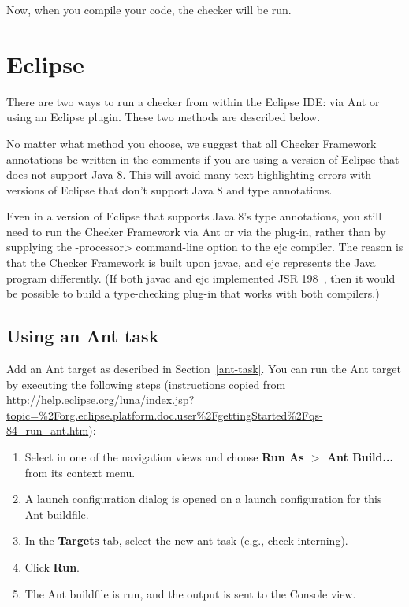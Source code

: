 Now, when you compile your code, the checker will be run.


\section{Eclipse\label{eclipse}}


There are two ways to run a checker from within the Eclipse IDE:  via Ant
or using an Eclipse plugin.  These two methods are described below.

No matter what method you choose, we suggest that
all Checker Framework annotations be written in the comments
if you are using a version of Eclipse that
does not support Java 8.  This will avoid many
text highlighting errors with versions of Eclipse that don't support Java 8
and type annotations.

Even in a version of Eclipse that supports Java 8's type annotations, you
still need to run the Checker Framework via Ant or via the plug-in, rather
than by supplying the \<-processor> command-line option to the ejc
compiler.  The reason is that the Checker Framework is built upon javac,
and ejc represents the Java program differently.  (If both javac and ejc
implemented JSR 198~\cite{JSR198}, then it would be possible to build
a type-checking plug-in that works with both compilers.)


\subsection{Using an Ant task\label{eclipse-ant}}

Add an Ant target as described in Section~\ref{ant-task}.  You can
run the Ant target by executing the following steps
(instructions copied from {\codesize\url{http://help.eclipse.org/luna/index.jsp?topic=%2Forg.eclipse.platform.doc.user%2FgettingStarted%2Fqs-84_run_ant.htm}}):

\begin{enumerate}

\item
  Select  in one of the navigation views and choose
  {\bf Run As $>$ Ant Build...} from its context menu.

\item
  A launch configuration dialog is opened on a launch configuration
  for this Ant buildfile.

\item
  In the {\bf Targets} tab, select the new ant task (e.g., check-interning).

\item
  Click {\bf Run}.

\item
  The Ant buildfile is run, and the output is sent to the Console view.

\end{enumerate}


